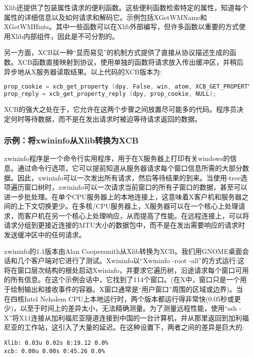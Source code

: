 Xlib还提供了包装属性请求的便利函数。这些便利函数检索特定的属性，知道每个属性的详细信息以及如何请求和解码它。示例包括XGetWMName和XGetWMHints。其中一些函数可以在Xlib外部编写，但许多函数以重要的方式使用Xlib内部组件，因此是不可分割的。

另一方面，XCB以一种“显而易见”的机制方式提供了直接从协议描述生成的函数。XCB函数直接映射到协议，使用单独的函数将请求放入传出缓冲区，并稍后异步地从X服务器读取结果。以上代码的XCB版本为:
\begin{lstlisting}[language=C]
prop_cookie = xcb_get_property (dpy, False, win, atom, XCB_GET_PROPERTY_TYPE_ANY, 0, 0);
prop_reply = xcb_get_property_reply (dpy, prop_cookie, NULL);
\end{lstlisting}
\vspace{-4em}

\noindent XCB的强大之处在于，它允许在这两个步骤之间放置尽可能多的代码。程序员决定何时等待数据，而不是在发出请求时被迫等待请求返回的数据。

\subsubsection{示例：将xwininfo从Xlib转换为XCB}

xwininfo程序是一个命令行实用程序，用于在X服务器上打印有关windows的信息。通过命令行选项，它可以提前知道从服务器请求每个窗口信息所需的大部分数据。因此，xwininfo可以一次发出所有请求，然后等待结果的到来。当使用-tree选项遍历窗口树时，xwininfo可以一次请求当前窗口的所有子窗口的数据，甚至可以进一步批处理。在单个CPU服务器上的本地连接上，这意味着X客户机和服务器之间的上下文切换更少。在多核/CPU服务器上，X服务器可以在一个核心上处理请求，而客户机在另一个核心上处理响应，从而提高了性能。在远程连接上，可以将请求分组到更接近连接的MTU大小的数据包中，而不是在发出需要响应的请求时发送缓冲区中的任何请求。

xwininfo的1.1版本由Alan Coopersmith从Xlib转换为XCB。我们用GNOME桌面会话和几个客户端对它进行了测试。Xwininfo以“Xwininfo -root -all”的方式运行:这将在窗口层次结构的根处启动Xwininfo，并要求它遍历树，沿途请求每个窗口可用的所有信息。在这个示例会话中，它找到了114个窗口。(在X中，窗口只是一个用于绘制输出和接收事件的容器。X窗口通常是“用户窗口”周围的区域或边界)。当在四核Intel Nehalem CPU上本地运行时，两个版本都运行得非常快(0.05秒或更少)，以至于时间上的差异太小，无法精确测量。为了测量远程性能，使用“ssh -X”将X11连接从加利福尼亚隧道连接到中国的一台计算机，并从那里返回到加利福尼亚的工作站，这引入了大量的延迟。在这种设置下，两者之间的差异是巨大的:
\begin{lstlisting}
Xlib: 0.03u 0.02s 8:19.12 0.0% 
xcb: 0.00u 0.00s 0:45.26 0.0% 
\end{lstlisting}

